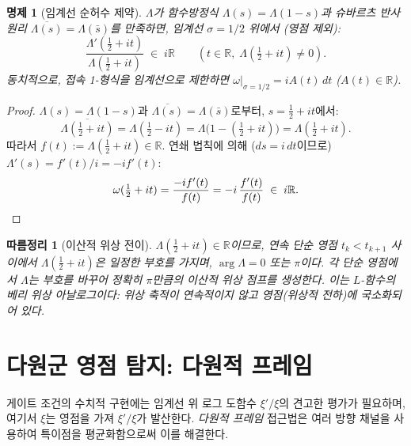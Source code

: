 \documentclass[11pt, a4paper]{article}
\theoremstyle{definition}
\theoremstyle{plain}
\newtheorem{proposition}[theorem]{명제}
\newtheorem{corollary}[theorem]{따름정리}
\newcommand{\xif}{\xi}
\begin{document}
\begin{proposition}[임계선 순허수 제약]
\label{prop:imaginary_connection}
$\Lambda$가 함수방정식 $\Lambda(s) = \Lambda(1-s)$과 슈바르츠 반사 원리
$\overline{\Lambda(s)} = \Lambda(\bar{s})$를 만족하면, 임계선 $\sigma = 1/2$ 위에서
(영점 제외):
\begin{equation}
  \frac{\Lambda'(\tfrac{1}{2}+it)}{\Lambda(\tfrac{1}{2}+it)}
  \;\in\; i\mathbb{R}
  \qquad (t \in \mathbb{R},\; \Lambda(\tfrac{1}{2}+it) \neq 0).
  \label{eq:purely_imaginary}
\end{equation}
동치적으로, 접속 1-형식을 임계선으로 제한하면
$\omega|_{\sigma=1/2} = iA(t)\,dt$ ($A(t) \in \mathbb{R}$).
\end{proposition}

\begin{proof}
$\Lambda(s) = \Lambda(1-s)$과 $\overline{\Lambda(s)} = \Lambda(\bar{s})$로부터,
$s = \tfrac{1}{2}+it$에서:
\[
  \overline{\Lambda(\tfrac{1}{2}+it)}
  = \Lambda(\tfrac{1}{2}-it)
  = \Lambda\bigl(1 - (\tfrac{1}{2}+it)\bigr)
  = \Lambda(\tfrac{1}{2}+it).
\]
따라서 $f(t) := \Lambda(\tfrac{1}{2}+it) \in \mathbb{R}$.
연쇄 법칙에 의해 ($ds = i\,dt$이므로) $\Lambda'(s) = f'(t)/i = -if'(t)$:
\[
  \omega(\tfrac{1}{2}+it)
  = \frac{-if'(t)}{f(t)}
  = -i\,\frac{f'(t)}{f(t)}
  \;\in\; i\mathbb{R}. \qedhere
\]
\end{proof}

\begin{corollary}[이산적 위상 전이]
\label{cor:discrete_phase}
$\Lambda(\tfrac{1}{2}+it) \in \mathbb{R}$이므로, 연속 단순 영점
$t_k < t_{k+1}$ 사이에서 $\Lambda(\tfrac{1}{2}+it)$은 일정한 부호를 가지며,
$\arg\Lambda = 0$ 또는 $\pi$이다. 각 단순 영점에서 $\Lambda$는 부호를 바꾸어
정확히 $\pi$만큼의 이산적 위상 점프를 생성한다.
이는 $L$-함수의 베리 위상 아날로그이다: 위상 축적이 연속적이지 않고
영점(위상적 전하)에 국소화되어 있다.
\end{corollary}


\section{다원군 영점 탐지: 다원적 프레임}
\label{sec:polyadic}

게이트 조건의 수치적 구현에는 임계선 위 로그 도함수 $\xif'/\xif$의 견고한 평가가 필요하며, 여기서 $\xif$는 영점을 가져 $\xif'/\xif$가 발산한다. \textit{다원적 프레임} 접근법은 여러 방향 채널을 사용하여 특이점을 평균화함으로써 이를 해결한다.
\end{document}
